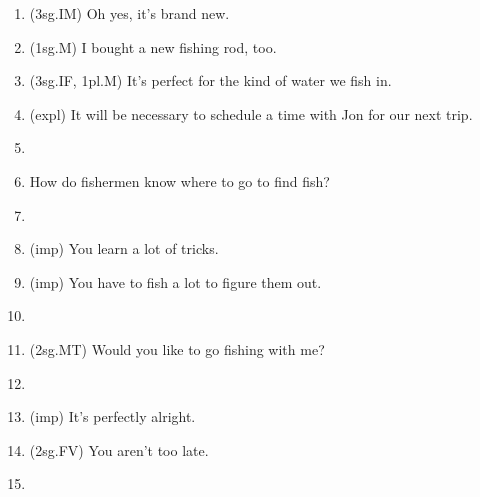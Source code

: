\begin{enumerate}
    \item (3sg.IM) Oh yes, it's brand new.
    \item (1sg.M) I bought a new fishing rod, too.
    \item (3sg.IF, 1pl.M) It's perfect for the kind of water we fish in.
    \item (expl) It will be necessary to schedule a time with Jon for our next trip.
    \item[] \\
    \item How do fishermen know where to go to find fish?
    \item[] \\
    \item (imp) You learn a lot of tricks.
    \item (imp) You have to fish a lot to figure them out.
    \item[] \\
    \item (2sg.MT) Would you like to go fishing with me?
    \item[] \\
    \item (imp) It's perfectly alright.
    \item (2sg.FV) You aren't too late.
    \item[] \\
  \end{enumerate}
